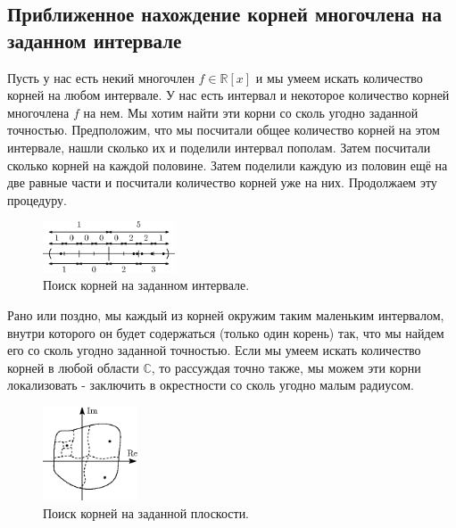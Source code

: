\documentclass[12pt]{article}
\newcommand{\MR}{\mathbb{R}}
\newcommand{\MC}{\mathbb{C}}
\theoremstyle{definition}
\begin{document}
\subsection*{Приближенное нахождение корней многочлена на заданном интервале}
Пусть у нас есть некий многочлен $f \in \MR[x]$ и мы умеем искать количество корней на любом интервале. У нас есть интервал и некоторое количество корней многочлена $f$ на нем. Мы хотим найти эти корни со сколь угодно заданной точностью. Предположим, что мы посчитали общее количество корней на этом интервале, нашли сколько их и поделили интервал пополам. Затем посчитали сколько корней на каждой половине. Затем поделили каждую из половин ещё на две равные части и посчитали количество корней уже на них. Продолжаем эту процедуру.
\begin{figure}[H]
	\centering
	\includegraphics[width=0.35\textwidth]{AL1L19_1.eps}
	\caption{Поиск корней на заданном интервале.}
	\label{19_1}
\end{figure}
Рано или поздно, мы каждый из корней окружим таким маленьким интервалом, внутри которого он будет содержаться (только один корень) так, что мы найдем его со сколь угодно заданной точностью. Если мы умеем искать количество корней в любой области $\MC$, то рассуждая точно также, мы можем эти корни локализовать - заключить в окрестности со сколь угодно малым радиусом.
\begin{figure}[H]
	\centering
	\includegraphics[width=0.25\textwidth]{AL1L19_2.eps}
	\caption{Поиск корней на заданной плоскости.}
	\label{19_2}
\end{figure}
\end{document}
